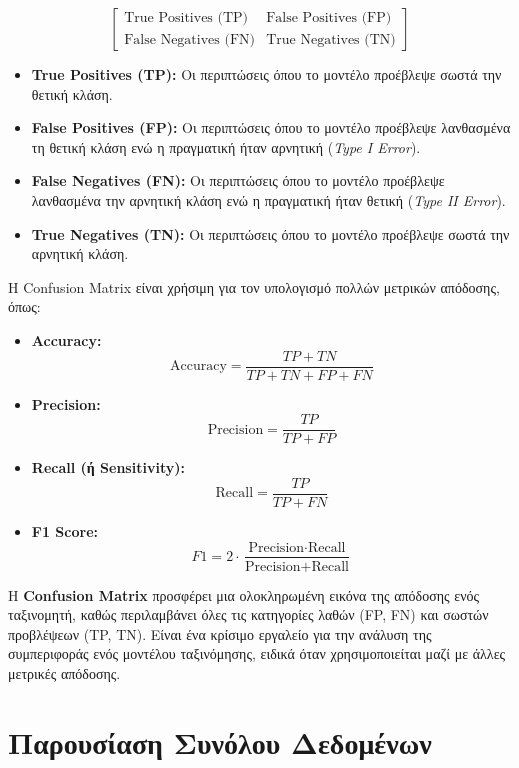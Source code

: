 \documentclass[diploma]{softlab-thesis}
\begin{document}
\[
\begin{bmatrix}
\text{True Positives (TP)} & \text{False Positives (FP)} \\
\text{False Negatives (FN)} & \text{True Negatives (TN)}
\end{bmatrix}
\]

\begin{itemize}
    \item \textbf{True Positives (TP):} Οι περιπτώσεις όπου το μοντέλο προέβλεψε σωστά την θετική κλάση.
    \item \textbf{False Positives (FP):} Οι περιπτώσεις όπου το μοντέλο προέβλεψε λανθασμένα τη θετική κλάση ενώ η πραγματική ήταν αρνητική (\textit{Type I Error}).
    \item \textbf{False Negatives (FN):} Οι περιπτώσεις όπου το μοντέλο προέβλεψε λανθασμένα την αρνητική κλάση ενώ η πραγματική ήταν θετική (\textit{Type II Error}).
    \item \textbf{True Negatives (TN):} Οι περιπτώσεις όπου το μοντέλο προέβλεψε σωστά την αρνητική κλάση.
\end{itemize}

Η Confusion Matrix είναι χρήσιμη για τον υπολογισμό πολλών μετρικών απόδοσης, όπως:
\begin{itemize}
    \item \textbf{Accuracy:}
    \[
    \text{Accuracy} = \frac{TP + TN}{TP + TN + FP + FN}
    \]
    \item \textbf{Precision:}
    \[
    \text{Precision} = \frac{TP}{TP + FP}
    \]
    \item \textbf{Recall (ή Sensitivity):}
    \[
    \text{Recall} = \frac{TP}{TP + FN}
    \]
    \item \textbf{F1 Score:}
    \[
    F1 = 2 \cdot \frac{\text{Precision} \cdot \text{Recall}}{\text{Precision} + \text{Recall}}
    \]
\end{itemize}

Η \textbf{Confusion Matrix} προσφέρει μια ολοκληρωμένη εικόνα της απόδοσης ενός ταξινομητή, καθώς περιλαμβάνει όλες τις κατηγορίες λαθών (FP, FN) και σωστών προβλέψεων (TP, TN). Είναι ένα κρίσιμο εργαλείο για την ανάλυση της συμπεριφοράς ενός μοντέλου ταξινόμησης, ειδικά όταν χρησιμοποιείται μαζί με άλλες μετρικές απόδοσης.



\chapter{Παρουσίαση Συνόλου Δεδομένων}
\end{document}
